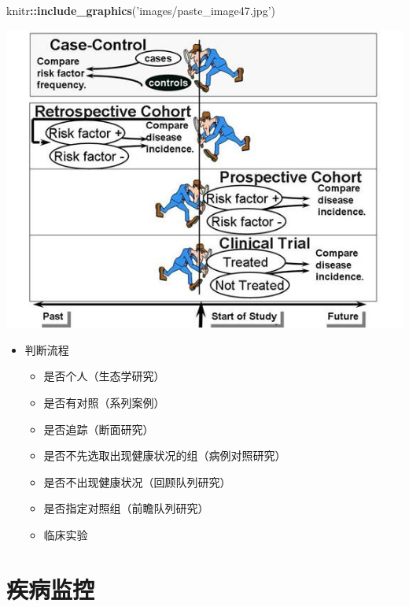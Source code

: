 \documentclass[]{book}
\newenvironment{Shaded}{\begin{snugshade}}{\end{snugshade}}
\newcommand{\KeywordTok}[1]{\textcolor[rgb]{0.13,0.29,0.53}{\textbf{#1}}}
\newcommand{\NormalTok}[1]{#1}
\newcommand{\OperatorTok}[1]{\textcolor[rgb]{0.81,0.36,0.00}{\textbf{#1}}}
\newcommand{\StringTok}[1]{\textcolor[rgb]{0.31,0.60,0.02}{#1}}
\providecommand{\tightlist}{%
  \setlength{\itemsep}{0pt}\setlength{\parskip}{0pt}}
\begin{document}
\begin{Shaded}
\begin{Highlighting}[]
\NormalTok{knitr}\OperatorTok{::}\KeywordTok{include_graphics}\NormalTok{(}\StringTok{'images/paste_image47.jpg'}\NormalTok{)}
\end{Highlighting}
\end{Shaded}

\includegraphics[width=7.76in]{images/paste_image47}

\begin{itemize}
\tightlist
\item
  判断流程

  \begin{itemize}
  \tightlist
  \item
    是否个人（生态学研究）
  \item
    是否有对照（系列案例）
  \item
    是否追踪（断面研究）
  \item
    是否不先选取出现健康状况的组（病例对照研究）
  \item
    是否不出现健康状况（回顾队列研究）
  \item
    是否指定对照组（前瞻队列研究）
  \item
    临床实验
  \end{itemize}
\end{itemize}

\hypertarget{ux75beux75c5ux76d1ux63a7}{%
\section{疾病监控}\label{ux75beux75c5ux76d1ux63a7}}
\end{document}
